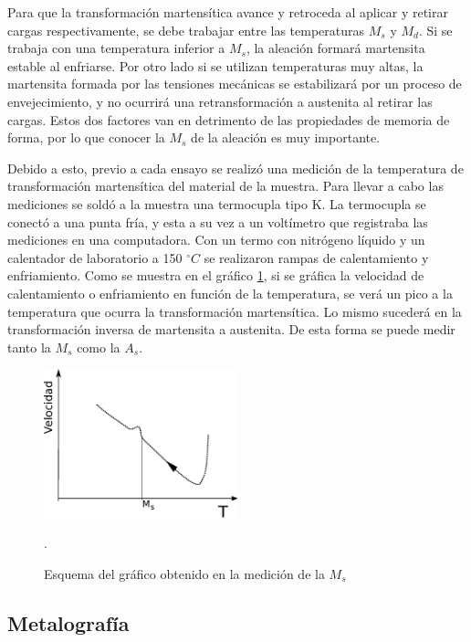 \documentclass[a4paper,12pt,fleqn,twoside,openany]{book}
\begin{document}
Para que la transformación martensítica avance y retroceda al aplicar y retirar cargas respectivamente,  se debe trabajar entre las temperaturas $M_s$ y $M_d$. Si se trabaja con una temperatura inferior a $M_s$, la aleación formará martensita estable al enfriarse. Por otro lado si se utilizan temperaturas muy altas, la martensita formada  por las tensiones mecánicas se estabilizará por un proceso de envejecimiento, y no ocurrirá una retransformación a austenita al retirar las cargas. Estos dos factores van en detrimento de las propiedades de memoria de forma, por lo que conocer la $M_s$ de la aleación es muy importante.

Debido a esto, previo a cada ensayo se realizó una medición de la temperatura de transformación martensítica del material de la muestra.
Para llevar a cabo las mediciones se soldó a la muestra una termocupla tipo K. La termocupla se conectó a una punta fría, y esta a su vez a un voltímetro que registraba las mediciones en una computadora. Con un termo con nitrógeno líquido y un calentador de laboratorio a 150 $^\circ C$  se realizaron rampas de calentamiento y enfriamiento. 
Como se muestra en el gráfico \ref{fig:Ms}, si se gráfica la velocidad de calentamiento o enfriamiento en función de la temperatura, se verá un pico a la temperatura que ocurra la transformación martensítica. Lo mismo sucederá en la transformación inversa de martensita a austenita. De esta forma se puede medir tanto la $M_s$ como la $A_s$.



\begin{figure}[h]
 \centering
 \includegraphics[width=0.5\textwidth]{Img/Procedimiento/Ms.eps}
 \caption{Esquema del gráfico obtenido en la medición de la $M_s$}. 
 \label{fig:Ms}
 \end{figure}


\subsection{Metalografía}
\end{document}
